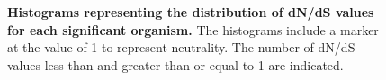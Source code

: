 \documentclass{article}
\begin{document}
\begin{figure}[H]
\centering
{}
\caption{\textbf{Histograms representing the distribution of dN/dS values for each significant organism.} The histograms include a marker at the value of 1 to represent neutrality. The number of dN/dS values less than and greater than or equal to 1 are indicated.}
\label{fig_5}
\end{figure}
\end{document}
